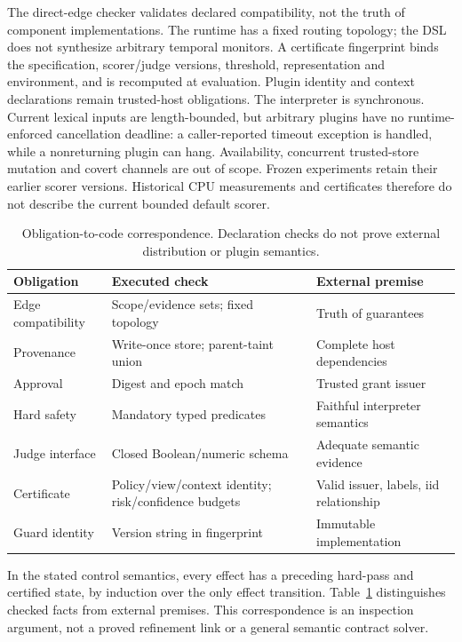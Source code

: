 \documentclass[lettersize,journal]{IEEEtran}
\begin{document}
The direct-edge checker validates declared compatibility, not the truth of
component implementations. The runtime has a fixed routing topology; the DSL
does not synthesize arbitrary temporal monitors. A certificate fingerprint
binds the specification, scorer/judge versions, threshold, representation and
environment, and is recomputed at evaluation. Plugin identity and context
declarations remain trusted-host obligations. The interpreter is synchronous.
Current lexical inputs are length-bounded, but arbitrary plugins have no
runtime-enforced cancellation deadline: a caller-reported timeout exception
is handled, while a nonreturning plugin can hang. Availability, concurrent
trusted-store mutation and covert channels are out of scope. Frozen experiments
retain their earlier scorer versions.
Historical CPU measurements and certificates therefore do not describe the
current bounded default scorer.

\begin{table}[t]
\caption{Obligation-to-code correspondence. Declaration checks do not prove
external distribution or plugin semantics.}
\label{tab:obligations}
\centering\scriptsize
\begin{tabular}{p{}p{}p{}}
\hline
Obligation & Executed check & External premise\\
\hline
Edge compatibility & Scope/evidence sets; fixed topology & Truth of guarantees\\
Provenance & Write-once store; parent-taint union & Complete host dependencies\\
Approval & Digest and epoch match & Trusted grant issuer\\
Hard safety & Mandatory typed predicates & Faithful interpreter semantics\\
Judge interface & Closed Boolean/numeric schema & Adequate semantic evidence\\
Certificate & Policy/view/context identity; risk/confidence budgets & Valid issuer, labels, iid relationship\\
Guard identity & Version string in fingerprint & Immutable implementation\\
\hline
\end{tabular}
\end{table}

In the stated control semantics, every effect has a preceding hard-pass and
certified state, by induction over the only effect transition.
Table~\ref{tab:obligations} distinguishes checked facts from external premises.
This correspondence is an inspection argument, not a proved refinement link
or a general semantic contract solver.
\end{document}
